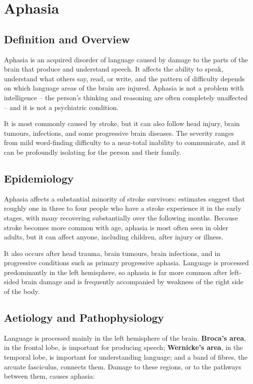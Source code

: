 \chapter{Aphasia}

\section*{Definition and Overview}
Aphasia is an acquired disorder of language caused by damage to the parts of the brain that produce and understand speech. It affects the ability to speak, understand what others say, read, or write, and the pattern of difficulty depends on which language areas of the brain are injured. Aphasia is not a problem with intelligence -- the person's thinking and reasoning are often completely unaffected -- and it is not a psychiatric condition.

It is most commonly caused by stroke, but it can also follow head injury, brain tumours, infections, and some progressive brain diseases. The severity ranges from mild word-finding difficulty to a near-total inability to communicate, and it can be profoundly isolating for the person and their family.

\section*{Epidemiology}
Aphasia affects a substantial minority of stroke survivors: estimates suggest that roughly one in three to four people who have a stroke experience it in the early stages, with many recovering substantially over the following months. Because stroke becomes more common with age, aphasia is most often seen in older adults, but it can affect anyone, including children, after injury or illness.

It also occurs after head trauma, brain tumours, brain infections, and in progressive conditions such as primary progressive aphasia. Language is processed predominantly in the left hemisphere, so aphasia is far more common after left-sided brain damage and is frequently accompanied by weakness of the right side of the body.

\section*{Aetiology and Pathophysiology}
Language is processed mainly in the left hemisphere of the brain. \textbf{Broca's area}, in the frontal lobe, is important for producing speech; \textbf{Wernicke's area}, in the temporal lobe, is important for understanding language; and a band of fibres, the arcuate fasciculus, connects them. Damage to these regions, or to the pathways between them, causes aphasia:

